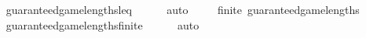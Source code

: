 \begin{isabellebody}
\ \ \ \ \isamarkupfalse%
\ guaranteed{\isacharunderscore}game{\isacharunderscore}lengths{\isacharunderscore}leq\isanewline
\ \ \ \ \isamarkupfalse%
\ auto\ \isanewline
{}\isamarkupfalse%
\isanewline
\ \ \isamarkupfalse%
\ {\isachardoublequoteopen}finite\ guaranteed{\isacharunderscore}game{\isacharunderscore}lengths{\isachardoublequoteclose}\isanewline
\ \ \ \ \isamarkupfalse%
\ guaranteed{\isacharunderscore}game{\isacharunderscore}lengths{\isacharunderscore}finite\isanewline
\ \ \ \ \isamarkupfalse%
\ auto\isanewline
{}\isamarkupfalse%
%
\endisatagproof
{\isafoldproof}%
%
\isadelimproof
\isanewline
%
\endisadelimproof
\isanewline
{}\isamarkupfalse%
\isanewline
%
\isadelimtheory
\isanewline
%
\endisadelimtheory
%
\isatagtheory
{}\isamarkupfalse%
%
\endisatagtheory
{\isafoldtheory}%
%
\isadelimtheory
%
\endisadelimtheory
%
\end{isabellebody}%
\endinput
